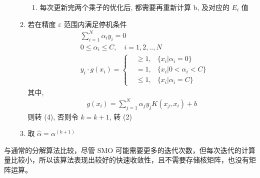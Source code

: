 \documentclass[oneside, 12pt]{ctexbook}
\begin{document}
\begin{enumerate}
\begin{enumerate}[(1)]
\begin{enumerate}
									\item 每次更新完两个乘子的优化后, 都需要再重新计算 b, 及对应的 $E_i$ 值
								 \end{enumerate}
									
							\item 若在精度 $\varepsilon$ 范围内满足停机条件
								\begin{align}
									&\sum_{i=1}^{N} \alpha_i y_i = 0\\
									&0 \leq \alpha_i \leq C, \quad i =1,2,..,N\\
									&y_i \cdot g(x_i) = 
										\left\{  
											\begin{matrix}
												&\geq 1, &\{x_i | \alpha_i=0 \}\\
												&=1, &\{ x_i | 0<\alpha_i<C\}\\
												&\leq 1, &\{ x_i | \alpha_i = C\}
											\end{matrix}
										\right.
								\end{align}
								其中, 
									\begin{align}
										g(x_i) = \sum_{j=1}^{N} \alpha_j y_j K(x_j, x_i) + b
									\end{align}
								则转 (4), 否则令 $k = k + 1$, 转 (2)
								
							\item 取 $\hat{\alpha} = \alpha^{(k+1)}$
						\end{enumerate}
				\end{enumerate}
			
			与通常的分解算法比较，尽管 SMO 可能需要更多的迭代次数，但每次迭代的计算量比较小，所以该算法表现出较好的快速收敛性，且不需要存储核矩阵，也没有矩阵运算。
\end{document}
